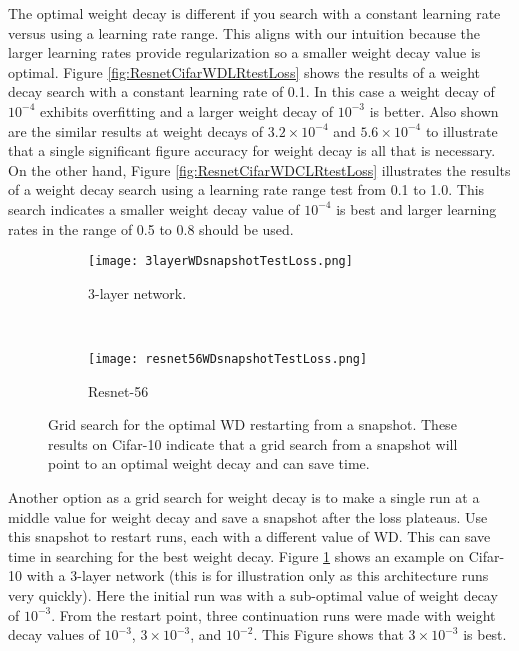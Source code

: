 \documentclass{article} %
\begin{document}
The optimal weight decay is different if you search with a constant learning rate versus using a learning rate range.  This aligns with our intuition because the larger learning rates provide regularization so a smaller weight decay value is optimal.   Figure \ref{fig:ResnetCifarWDLRtestLoss} shows the results of a weight decay search with a constant learning rate of 0.1.  In this case a weight decay of $10^{-4}$ exhibits overfitting and a larger weight decay of $10^{-3}$ is better.  Also shown are the similar results at weight decays of $3.2 \times 10^{-4}$ and $5.6 \times 10^{-4}$ to illustrate that a single significant figure accuracy for weight decay is all that is necessary.   On the other hand, Figure \ref{fig:ResnetCifarWDCLRtestLoss} illustrates the results of a weight decay search using a learning rate range test from 0.1 to 1.0.  This search indicates a smaller weight decay value of $10^{-4}$ is best and larger learning rates in the range of 0.5 to 0.8 should be used. 


\begin{figure}[tbh]
	\centering
	\begin{subfigure}[b]{0.46\textwidth}
		\texttt{[image: 3layerWDsnapshotTestLoss.png]}
		\caption{3-layer network.}
		\label{fig:3layerWDsnapshotTestLoss}       %
	\end{subfigure}
	\quad
	\hfill
	~ %
	\centering
	\begin{subfigure}[b]{0.46\textwidth}
		\texttt{[image: resnet56WDsnapshotTestLoss.png]}
		\caption{Resnet-56}
		\label{fig:resnet56WDsnapshotTestLoss}       %
	\end{subfigure}
	\caption{Grid search for the optimal WD restarting from a snapshot.  These results on Cifar-10 indicate that a grid search from a snapshot will point to an optimal weight decay and can save time. }
	\label{fig:WDfromSnapshot}
	\vspace{-5pt}	
\end{figure}


Another option as a grid search for weight decay is to make a single run at a middle value for weight decay and save a snapshot after the loss plateaus.  Use this snapshot to restart runs, each with a different value of WD.  This can save  time in searching for the best weight decay.  Figure \ref{fig:3layerWDsnapshotTestLoss} shows an example on Cifar-10 with a 3-layer network (this is for illustration only as this architecture runs very quickly).  Here the initial run was with a sub-optimal value of weight decay of $10^{-3}$.  From the restart point, three continuation runs were made with weight decay values of $10^{-3}$, $3 \times 10^{-3}$, and $10^{-2}$. This Figure shows that $3 \times 10^{-3}$ is best.
\end{document}
